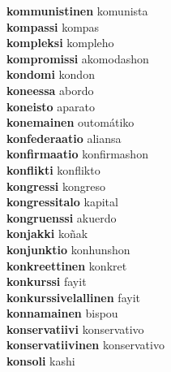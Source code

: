 \textbf{kommunistinen } komunista \\
\textbf{kompassi } kompas \\
\textbf{kompleksi } kompleho \\
\textbf{kompromissi } akomodashon \\
\textbf{kondomi } kondon \\
\textbf{koneessa } abordo \\
\textbf{koneisto } aparato \\
\textbf{konemainen } outomátiko \\
\textbf{konfederaatio } aliansa \\
\textbf{konfirmaatio } konfirmashon \\
\textbf{konflikti } konflikto \\
\textbf{kongressi } kongreso \\
\textbf{kongressitalo } kapital \\
\textbf{kongruenssi } akuerdo \\
\textbf{konjakki } koñak \\
\textbf{konjunktio } konhunshon \\
\textbf{konkreettinen } konkret \\
\textbf{konkurssi } fayit \\
\textbf{konkurssivelallinen } fayit \\
\textbf{konnamainen } bispou \\
\textbf{konservatiivi } konservativo \\
\textbf{konservatiivinen } konservativo \\
\textbf{konsoli } kashi \\
